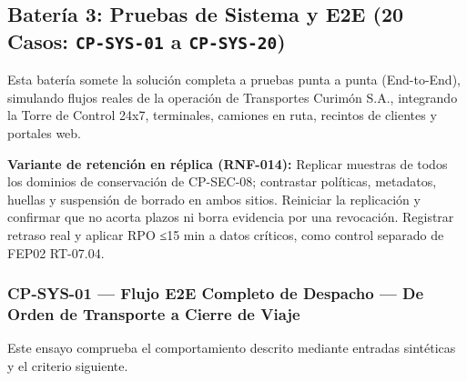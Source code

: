 \subsection*{Batería 3: Pruebas de Sistema y E2E (20 Casos: \texttt{C\allowbreak{}P\allowbreak{}-\allowbreak{}S\allowbreak{}Y\allowbreak{}S\allowbreak{}-\allowbreak{}0\allowbreak{}1\allowbreak{}} a \texttt{C\allowbreak{}P\allowbreak{}-\allowbreak{}S\allowbreak{}Y\allowbreak{}S\allowbreak{}-\allowbreak{}2\allowbreak{}0\allowbreak{}})}

Esta batería somete la solución completa a pruebas punta a punta (End-to-End), simulando flujos reales de la operación de Transportes Curimón S.A., integrando la Torre de Control 24x7, terminales, camiones en ruta, recintos de clientes y portales web.




\par\noindent\textbf{Variante de retención en réplica (RNF-014):} Replicar muestras de todos los dominios de conservación de CP-SEC-08; contrastar políticas, metadatos, huellas y suspensión de borrado en ambos sitios. Reiniciar la replicación y confirmar que no acorta plazos ni borra evidencia por una revocación. Registrar retraso real y aplicar RPO ≤15 min a datos críticos, como control separado de FEP02 RT-07.04.\par\par







\subsubsection*{CP-SYS-01 — Flujo E2E Completo de Despacho — De Orden de Transporte a Cierre de Viaje}\label{sec:9-cp-sys-01}
Este ensayo comprueba el comportamiento descrito mediante entradas sintéticas y el criterio siguiente.

